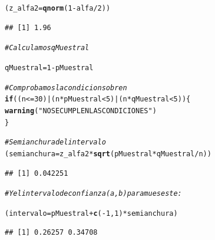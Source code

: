 \documentclass[10pt,a4paper]{article}\usepackage[]{graphicx}\usepackage[]{color}
\makeatletter
\newcommand{\hlnum}[1]{\textcolor[rgb]{0.686,0.059,0.569}{#1}}%
\newcommand{\hlstr}[1]{\textcolor[rgb]{0.192,0.494,0.8}{#1}}%
\newcommand{\hlcom}[1]{\textcolor[rgb]{0.678,0.584,0.686}{\textit{#1}}}%
\newcommand{\hlopt}[1]{\textcolor[rgb]{0,0,0}{#1}}%
\newcommand{\hlstd}[1]{\textcolor[rgb]{0.345,0.345,0.345}{#1}}%
\newcommand{\hlkwa}[1]{\textcolor[rgb]{0.161,0.373,0.58}{\textbf{#1}}}%
\newcommand{\hlkwb}[1]{\textcolor[rgb]{0.69,0.353,0.396}{#1}}%
\newcommand{\hlkwd}[1]{\textcolor[rgb]{0.737,0.353,0.396}{\textbf{#1}}}%
\newenvironment{kframe}{%
 \def\at@end@of@kframe{}%
 \ifinner\ifhmode%
  \def\at@end@of@kframe{\end{minipage}}%
  \begin{minipage}{\columnwidth}%
 \fi\fi%
 \def\FrameCommand##1{\hskip\@totalleftmargin \hskip-\fboxsep
 \colorbox{shadecolor}{##1}\hskip-\fboxsep
     \hskip-\linewidth \hskip-\@totalleftmargin \hskip\columnwidth}%
 \MakeFramed {\advance\hsize-\width
   \@totalleftmargin\z@ \linewidth\hsize
   \@setminipage}}%
 {\par\unskip\endMakeFramed%
 \at@end@of@kframe}
\newenvironment{knitrout}{}{} %
\makeatother
\begin{document}
\begin{enumerate}
\begin{knitrout}
\begin{kframe}
\begin{alltt}
\hlstd{(z_alfa2} \hlkwb{=} \hlkwd{qnorm}\hlstd{(} \hlnum{1} \hlopt{-} \hlstd{alfa} \hlopt{/} \hlnum{2} \hlstd{) )}
\end{alltt}
\begin{verbatim}
## [1] 1.96
\end{verbatim}
\begin{alltt}
\hlcom{# Calculamos qMuestral}

\hlstd{qMuestral} \hlkwb{=} \hlnum{1} \hlopt{-} \hlstd{pMuestral}

\hlcom{# Comprobamos la condicion sobre n}
\hlkwa{if}\hlstd{((n}\hlopt{<=}\hlnum{30}\hlstd{)}\hlopt{|}\hlstd{(n}\hlopt{*}\hlstd{pMuestral}\hlopt{<}\hlnum{5}\hlstd{)}\hlopt{|}\hlstd{(n}\hlopt{*}\hlstd{qMuestral}\hlopt{<}\hlnum{5}\hlstd{))\{}
  \hlkwd{warning}\hlstd{(}\hlstr{"NO SE CUMPLEN LAS CONDICIONES"}\hlstd{)}
\hlstd{\}}


\hlcom{# Semianchura del intervalo}
\hlstd{(semianchura}\hlkwb{=}\hlstd{z_alfa2} \hlopt{*} \hlkwd{sqrt}\hlstd{(pMuestral} \hlopt{*} \hlstd{qMuestral} \hlopt{/} \hlstd{n) )}
\end{alltt}
\begin{verbatim}
## [1] 0.042251
\end{verbatim}
\begin{alltt}
\hlcom{# Y el intervalo de confianza (a,b) para mu es este:}

\hlstd{(intervalo} \hlkwb{=} \hlstd{pMuestral} \hlopt{+} \hlkwd{c}\hlstd{(}\hlopt{-}\hlnum{1}\hlstd{,} \hlnum{1}\hlstd{)} \hlopt{*} \hlstd{semianchura )}
\end{alltt}
\begin{verbatim}
## [1] 0.26257 0.34708
\end{verbatim}
\end{kframe}
\end{knitrout}


\end{enumerate}
\end{document}
